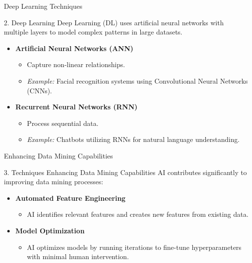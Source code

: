 \documentclass[aspectratio=169]{beamer}
\begin{document}
\begin{frame}[fragile]{Deep Learning Techniques}
    \begin{block}{2. Deep Learning}
        Deep Learning (DL) uses artificial neural networks with multiple layers to model complex patterns in large datasets.
    \end{block}
    \begin{itemize}
        \item \textbf{Artificial Neural Networks (ANN)}
            \begin{itemize}
                \item Capture non-linear relationships.
                \item \textit{Example:} Facial recognition systems using Convolutional Neural Networks (CNNs).
            \end{itemize}

        \item \textbf{Recurrent Neural Networks (RNN)}
            \begin{itemize}
                \item Process sequential data. 
                \item \textit{Example:} Chatbots utilizing RNNs for natural language understanding.
            \end{itemize}
    \end{itemize}
\end{frame}

\begin{frame}[fragile]{Enhancing Data Mining Capabilities}
    \begin{block}{3. Techniques Enhancing Data Mining Capabilities}
        AI contributes significantly to improving data mining processes:
    \end{block}
    \begin{itemize}
        \item \textbf{Automated Feature Engineering}
            \begin{itemize}
                \item AI identifies relevant features and creates new features from existing data.
            \end{itemize}
            
        \item \textbf{Model Optimization}
            \begin{itemize}
                \item AI optimizes models by running iterations to fine-tune hyperparameters with minimal human intervention.
            \end{itemize}
    \end{itemize}
\end{frame}
\end{document}
